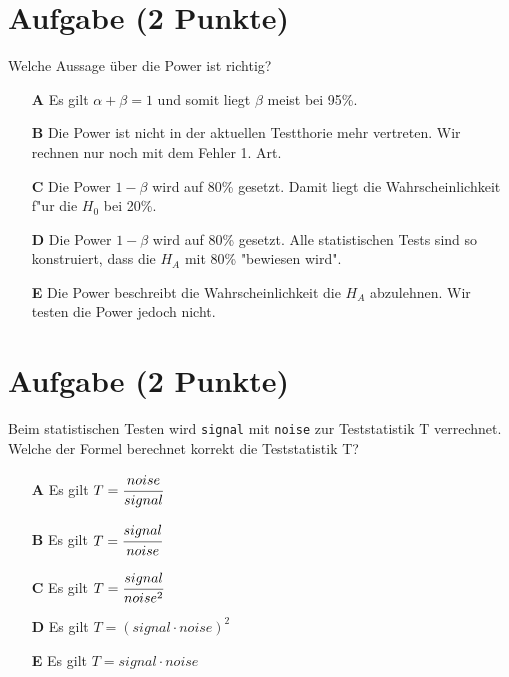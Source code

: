\documentclass[a4paper, 10pt]{scrartcl}\usepackage[]{graphicx}\usepackage[]{xcolor}
\begin{document}
\section{Aufgabe \hfill (2 Punkte)}

Welche Aussage {\"u}ber die Power ist richtig?



\begin{enumerate}
\item [\textbf{A} \msquare] Es gilt $\alpha + \beta = 1$ und somit liegt $\beta$ meist bei 95\%.
\item [\textbf{B} \msquare] Die Power ist nicht in der aktuellen Testthorie mehr vertreten. Wir rechnen nur noch mit dem Fehler 1. Art.
\item [\textbf{C} \msquare] Die Power $1-\beta$ wird auf 80\% gesetzt. Damit liegt die Wahrscheinlichkeit f{"u}r die $H_0$ bei 20\%.
\item [\textbf{D} \msquare] Die Power $1-\beta$ wird auf 80\% gesetzt. Alle statistischen Tests sind so konstruiert, dass die $H_A$ mit 80\% "bewiesen wird".
\item [\textbf{E} \msquare] Die Power beschreibt die Wahrscheinlichkeit die $H_A$ abzulehnen. Wir testen die Power jedoch nicht.
\end{enumerate}

\section{Aufgabe \hfill (2 Punkte)}

Beim statistischen Testen wird \texttt{signal} mit \texttt{noise} zur
Teststatistik T verrechnet. Welche der Formel berechnet korrekt die
Teststatistik T?



\begin{enumerate}
\item [\textbf{A} \msquare] Es gilt $T = \cfrac{noise}{signal}$
\item [\textbf{B} \msquare] Es gilt $T = \cfrac{signal}{noise}$
\item [\textbf{C} \msquare] Es gilt $T = \cfrac{signal}{noise^2}$
\item [\textbf{D} \msquare] Es gilt $T = (signal \cdot noise)^2$
\item [\textbf{E} \msquare] Es gilt $T = signal \cdot noise$
\end{enumerate}

\end{document}
